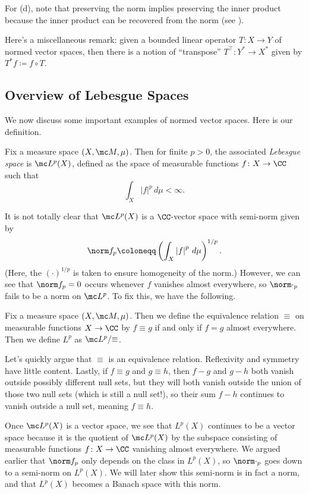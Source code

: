 \documentclass[../notes.tex]{subfiles}
\begin{document}
\begin{remark}
	For (d), note that preserving the norm implies preserving the inner product because the inner product can be recovered from the norm (see ).
\end{remark}
\begin{remark}
	Here's a miscellaneous remark: given a bounded linear operator $T\colon X\to Y$ of normed vector spaces, then there is a notion of ``transpose'' $T^\intercal\colon Y^*\to X^*$ given by $T^*f\coloneqq f\circ T$.
\end{remark}

\subsection{Overview of Lebesgue Spaces}
We now discuss some important examples of normed vector spaces. Here is our definition.
\begin{definition}
	Fix a measure space $(X,\mc M,\mu)$. Then for finite $p>0$, the associated \textit{Lebesgue space} is $\mc L^p(X)$, defined as the space of measurable functions $f\colon X\to\CC$ such that
	\[\int_X\left|f\right|^p\,d\mu<\infty.\]
\end{definition}
It is not totally clear that $\mc L^p(X)$ is a $\CC$-vector space with semi-norm given by
\[\norm f_p\coloneqq\left(\int_X\left|f\right|^p\,d\mu\right)^{1/p}.\]
(Here, the $(\cdot)^{1/p}$ is taken to ensure homogeneity of the norm.) However, we can see that $\norm f_p=0$ occurs whenever $f$ vanishes almost everywhere, so $\norm\cdot_p$ fails to be a norm on $\mc L^p$. To fix this, we have the following.
\begin{definition}
	Fix a measure space $(X,\mc M,\mu)$. Then we define the equivalence relation $\equiv$ on measurable functions $X\to\CC$ by $f\equiv g$ if and only if $f=g$ almost everywhere. Then we define $L^p$ as $\mc L^p/{\equiv}$.
\end{definition}
\begin{remark}
	Let's quickly argue that $\equiv$ is an equivalence relation. Reflexivity and symmetry have little content. Lastly, if $f\equiv g$ and $g\equiv h$, then $f-g$ and $g-h$ both vanish outside possibly different null sets, but they will both vanish outside the union of those two null sets (which is still a null set!), so their sum $f-h$ continues to vanish outside a null set, meaning $f\equiv h$.
\end{remark}
Once $\mc L^p(X)$ is a vector space, we see that $L^p(X)$ continues to be a vector space because it is the quotient of $\mc L^p(X)$ by the subspace consisting of measurable functions $f\colon X\to\CC$ vanishing almost everywhere. We argued earlier that $\norm f_p$ only depends on the class in $L^p(X)$, so $\norm\cdot_p$ goes down to a semi-norm on $L^p(X)$. We will later show this semi-norm is in fact a norm, and that $L^p(X)$ becomes a Banach space with this norm.
\end{document}
